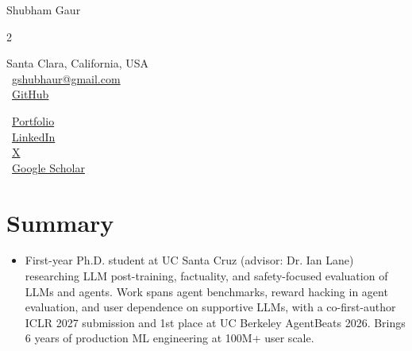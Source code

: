 \documentclass[letterpaper,11pt]{article}
\begin{document}
\begin{center}
    {\LARGE Shubham Gaur} \\ \vspace{0pt}
    \begin{multicols}{2}
    \begin{flushleft}
    \large{Santa Clara, California, USA} \\
    \large{\faEnvelope\ \href{mailto:gshubhaur@gmail.com}{gshubhaur@gmail.com}} \\
    \large{\faGithub\ \href{https://github.com/shubham2345}{GitHub}} \\
    \end{flushleft}

    \begin{flushright}
    \large{\faGlobe\ \href{https://shubham2345.github.io/}{Portfolio}} \\
    \large{\faLinkedin\ \href{https://www.linkedin.com/in/shubhamggaur/}{LinkedIn}} \\
    \large{\faTwitter\ \href{https://x.com/shubhamgaur98}{X}} \\
    \large{\faGraduationCap\ \href{https://scholar.google.com/citations?hl=en&user=afguXvoAAAAJ}{Google Scholar}} \\
    \end{flushright}
    \end{multicols}
\end{center}

\section{Summary}
\begin{itemize}[leftmargin=0.15in, label={}]
  \item[] \small First-year Ph.D. student at UC Santa Cruz (advisor: Dr. Ian Lane) researching LLM post-training,
  factuality, and safety-focused evaluation of LLMs and agents. Work spans agent benchmarks, reward hacking in
  agent evaluation, and user dependence on supportive LLMs, with a co-first-author ICLR 2027 submission and
  1st place at UC Berkeley AgentBeats 2026. Brings 6 years of production ML engineering at 100M+ user scale.
\end{itemize}
\end{document}
